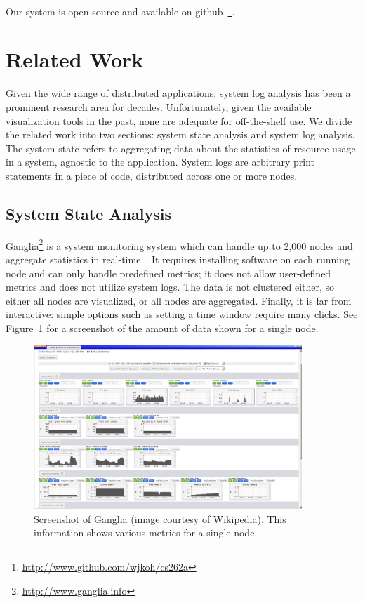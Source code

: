 \documentclass[conference]{style/acmsiggraph}
\begin{document}
Our system is open source and available on github~\footnote{\url{http://www.github.com/wjkoh/cs262a}}.


\section{Related Work}
Given the wide range of distributed applications, system log analysis has been a prominent research area for decades.
Unfortunately, given the available visualization tools in the past, none are adequate for off-the-shelf use.
We divide the related work into two sections: system state analysis and system log analysis.
The system state refers to aggregating data about the statistics of resource usage in a system, agnostic to the application.
System logs are arbitrary print statements in a piece of code, distributed across one or more nodes.

\subsection{System State Analysis}
Ganglia\footnote{\url{http://www.ganglia.info}} is a system monitoring system which can handle up to 2,000 nodes and aggregate statistics in real-time~\cite{Massie04}.
It requires installing software on each running node and can only handle predefined metrics; it does not allow user-defined metrics and does not utilize system logs.
The data is not clustered either, so either all nodes are visualized, or all nodes are aggregated.
Finally, it is far from interactive: simple options such as setting a time window require many clicks.
See Figure~\ref{fig:ganglia} for a screenshot of the amount of data shown for a single node.

\begin{figure}[p]
    \centering
    \includegraphics[width=0.9\textwidth]{images/ganglia.png}
    \caption{Screenshot of Ganglia (image courtesy of Wikipedia). This information shows various metrics for a single node.}
    \label{fig:ganglia}
\end{figure}
\end{document}

